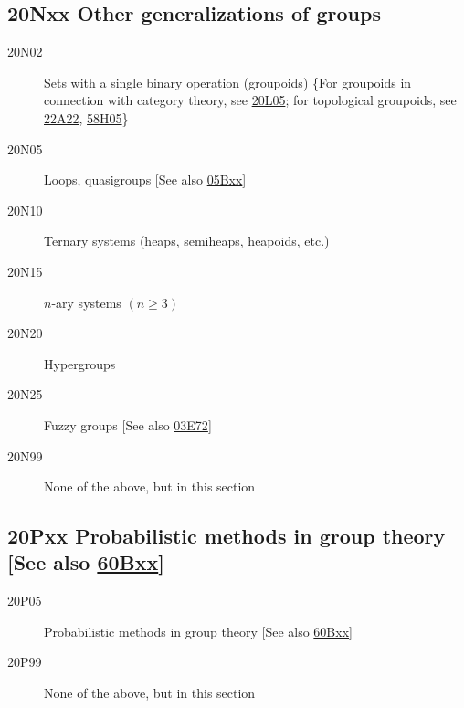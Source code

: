 \subsection*{20Nxx  Other generalizations of groups }\label{20Nxx}
\begin{description} 
\item [20N02]\label{20N02} Sets with a single binary operation (groupoids) \{For groupoids in connection with category theory, see \hyperref[20L05]{20L05}; for topological groupoids, see \hyperref[22A22]{22A22}, \hyperref[58H05]{58H05}\}
\item [20N05]\label{20N05} Loops, quasigroups [See also \hyperref[05Bxx]{05Bxx}]
\item [20N10]\label{20N10} Ternary systems (heaps, semiheaps, heapoids, etc.)
\item [20N15]\label{20N15} $n$-ary systems $(n\ge 3)$
\item [20N20]\label{20N20} Hypergroups
\item [20N25]\label{20N25} Fuzzy groups [See also \hyperref[03E72]{03E72}]
\item [20N99]\label{20N99} None of the above, but in this section
\end{description}
\subsection*{20Pxx  Probabilistic methods in group theory [See also \hyperref[60Bxx]{60Bxx}] }\label{20Pxx}
\begin{description} 
\item [20P05]\label{20P05} Probabilistic methods in group theory [See also \hyperref[60Bxx]{60Bxx}]
\item [20P99]\label{20P99} None of the above, but in this section
\end{description}
